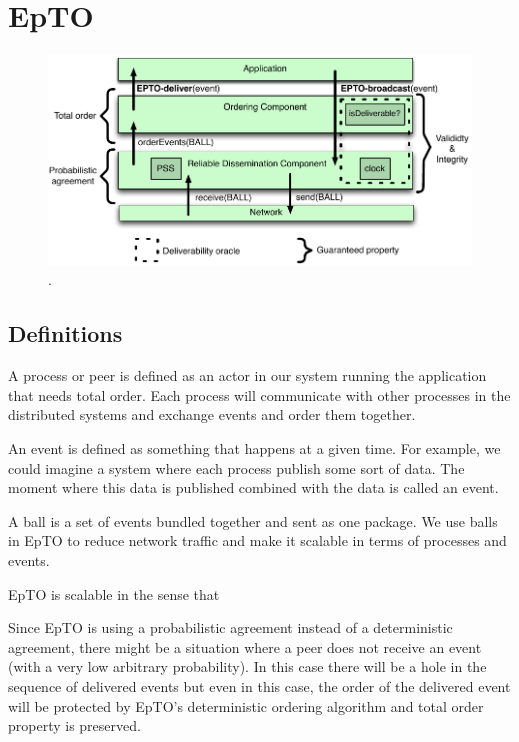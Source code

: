 \documentclass[10pt,conference,a4paper]{IEEEtran}
\begin{document}
\section{EpTO}
\begin{figure}
	\includegraphics[width=\linewidth]{figures/epto-architecture.png}
	\caption{\protect\footnotemark{}.}
	\label{fig:epto-architecture}
\end{figure}
\subsection{Definitions}
A process or peer is defined as an actor in our system running the application that needs total order. Each process will communicate with other processes in the distributed systems and exchange events and order them together.
\par
An event is defined as something that happens at a given time. For example, we could imagine a system where each process publish some sort of data. The moment where this data is published combined with the data is called an event.
\par
A ball is a set of events bundled together and sent as one package. We use balls in EpTO to reduce network traffic and make it scalable in terms of processes and events.

EpTO is scalable in the sense that 

\par
Since EpTO is using a probabilistic agreement instead of a deterministic agreement, there might be a situation where a peer does not receive an event (with a very low arbitrary probability). In this case there will be a hole in the sequence of delivered events but even in this case, the order of the delivered event will be protected by EpTO's deterministic ordering algorithm and total order property is preserved.
\end{document}
